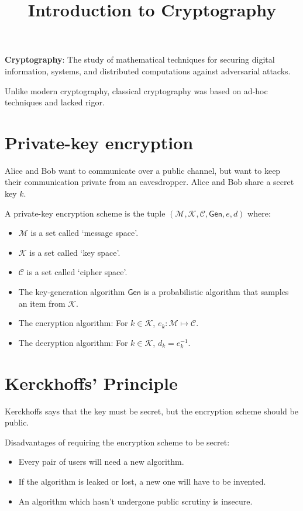 

\title{Introduction to Cryptography}



\initAfterBeginDocument{}

\textbf{Cryptography}: The study of mathematical techniques for securing
digital information, systems, and distributed computations against adversarial attacks.

Unlike modern cryptography, classical cryptography was based on ad-hoc techniques and lacked rigor.

\section{Private-key encryption}

Alice and Bob want to communicate over a public channel,
but want to keep their communication private from an eavesdropper.
Alice and Bob share a secret key $k$.

A private-key encryption scheme is the tuple
$(\mathcal{M}, \mathcal{K}, \mathcal{C}, \mathsf{Gen}, e, d)$ where:

\begin{itemize}
\item $\mathcal{M}$ is a set called `message space'.
\item $\mathcal{K}$ is a set called `key space'.
\item $\mathcal{C}$ is a set called `cipher space'.
\item The key-generation algorithm $\mathsf{Gen}$ is a probabilistic algorithm
that samples an item from $\mathcal{K}$.
\item The encryption algorithm: For $k \in \mathcal{K}$,
  $e_k: \mathcal{M} \mapsto \mathcal{C}$.
\item The decryption algorithm: For $k \in \mathcal{K}$, $d_k = e_k^{-1}$.
\end{itemize}


\section{Kerckhoffs' Principle}

Kerckhoffs says that the key must be secret, but the encryption scheme should be public.

Disadvantages of requiring the encryption scheme to be secret:

\begin{itemize}
\item Every pair of users will need a new algorithm.
\item If the algorithm is leaked or lost, a new one will have to be invented.
\item An algorithm which hasn't undergone public scrutiny is insecure.
\end{itemize}


